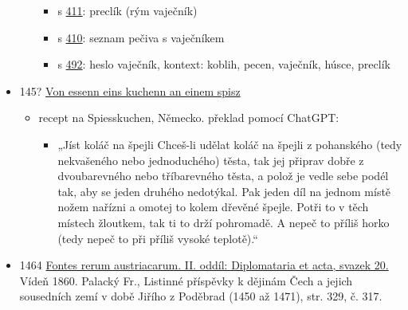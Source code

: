 \begin{itemize}
\begin{itemize}
    \begin{itemize}
    \tightlist
    \item
      s
      \href{https://sources.cms.flu.cas.cz/src/index.php?s=v&zoom=y&bookid=833&page=411&ft=vaje\%C4\%8Dn\%C3\%ADk}{411}:
      preclík (rým vaječník)
    \item
      s
      \href{https://sources.cms.flu.cas.cz/src/index.php?s=v&zoom=y&bookid=833&page=413&ft=vaje\%C4\%8Dn\%C3\%ADk}{410}:
      seznam pečiva s vaječníkem
    \item
      s
      \href{https://sources.cms.flu.cas.cz/src/index.php?s=v&bookid=833&page=495}{492}:
      heslo vaječník, kontext: koblih, pecen, vaječník, húsce, preclík
    \end{itemize}
  \end{itemize}
\item
  145? \href{https://gams.uni-graz.at/o:corema.h2a.46}{Von essenn eins
  kuchenn an einem spisz}

  \begin{itemize}
  \tightlist
  \item
    recept na Spiesskuchen, Německo. překlad pomocí ChatGPT:

    \begin{itemize}
    \tightlist
    \item
      „Jíst koláč na špejli Chceš-li udělat koláč na špejli z pohanského
      (tedy nekvašeného nebo jednoduchého) těsta, tak jej připrav dobře
      z dvoubarevného nebo tříbarevného těsta, a polož je vedle sebe
      podél tak, aby se jeden druhého nedotýkal. Pak jeden díl na jednom
      místě nožem nařízni a omotej to kolem dřevěné špejle. Potři to v
      těch místech žloutkem, tak ti to drží pohromadě. A nepeč to příliš
      horko (tedy nepeč to při příliš vysoké teplotě).``
    \end{itemize}
  \end{itemize}
\item
  1464
  \href{https://www.digitale-sammlungen.de/view/bsb10798133?page=354\%2C355}{Fontes
  rerum austriacarum. II. oddíl: Diplomataria et acta, svazek 20.} Vídeň
  1860. Palacký Fr., Listinné příspěvky k dějinám Čech a jejich
  sousedních zemí v době Jiřího z Poděbrad (1450 až 1471), str. 329, č.
  317.


\end{itemize}
